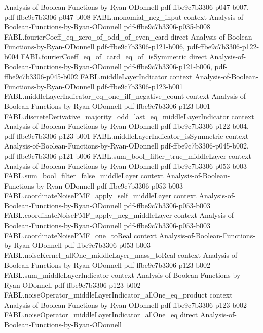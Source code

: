 \begin{theorem}
  {Analysis-of-Boolean-Functions-by-Ryan-ODonnell}
  {pdf-ffbe9c7b3306-p047-b007,
    pdf-ffbe9c7b3306-p047-b008}
\proofstep
  {FABL.monomial_neg_input}
  {context}
  {Analysis-of-Boolean-Functions-by-Ryan-ODonnell}
  {pdf-ffbe9c7b3306-p035-b008}
\proofstep
  {FABL.fourierCoeff_eq_zero_of_odd_of_even_card}
  {direct}
  {Analysis-of-Boolean-Functions-by-Ryan-ODonnell}
  {pdf-ffbe9c7b3306-p121-b006,
    pdf-ffbe9c7b3306-p122-b004}
\proofstep
  {FABL.fourierCoeff_eq_of_card_eq_of_isSymmetric}
  {direct}
  {Analysis-of-Boolean-Functions-by-Ryan-ODonnell}
  {pdf-ffbe9c7b3306-p121-b006,
    pdf-ffbe9c7b3306-p045-b002}
\proofstep
  {FABL.middleLayerIndicator}
  {context}
  {Analysis-of-Boolean-Functions-by-Ryan-ODonnell}
  {pdf-ffbe9c7b3306-p123-b001}
\proofstep
  {FABL.middleLayerIndicator_eq_one_iff_negative_count}
  {context}
  {Analysis-of-Boolean-Functions-by-Ryan-ODonnell}
  {pdf-ffbe9c7b3306-p123-b001}
\proofstep
  {FABL.discreteDerivative_majority_odd_last_eq_middleLayerIndicator}
  {context}
  {Analysis-of-Boolean-Functions-by-Ryan-ODonnell}
  {pdf-ffbe9c7b3306-p122-b004,
    pdf-ffbe9c7b3306-p123-b001}
\proofstep
  {FABL.middleLayerIndicator_isSymmetric}
  {context}
  {Analysis-of-Boolean-Functions-by-Ryan-ODonnell}
  {pdf-ffbe9c7b3306-p045-b002,
    pdf-ffbe9c7b3306-p121-b006}
\proofstep
  {FABL.sum_bool_filter_true_middleLayer}
  {context}
  {Analysis-of-Boolean-Functions-by-Ryan-ODonnell}
  {pdf-ffbe9c7b3306-p053-b003}
\proofstep
  {FABL.sum_bool_filter_false_middleLayer}
  {context}
  {Analysis-of-Boolean-Functions-by-Ryan-ODonnell}
  {pdf-ffbe9c7b3306-p053-b003}
\proofstep
  {FABL.coordinateNoisePMF_apply_self_middleLayer}
  {context}
  {Analysis-of-Boolean-Functions-by-Ryan-ODonnell}
  {pdf-ffbe9c7b3306-p053-b003}
\proofstep
  {FABL.coordinateNoisePMF_apply_neg_middleLayer}
  {context}
  {Analysis-of-Boolean-Functions-by-Ryan-ODonnell}
  {pdf-ffbe9c7b3306-p053-b003}
\proofstep
  {FABL.coordinateNoisePMF_one_toReal}
  {context}
  {Analysis-of-Boolean-Functions-by-Ryan-ODonnell}
  {pdf-ffbe9c7b3306-p053-b003}
\proofstep
  {FABL.noiseKernel_allOne_middleLayer_mass_toReal}
  {context}
  {Analysis-of-Boolean-Functions-by-Ryan-ODonnell}
  {pdf-ffbe9c7b3306-p123-b002}
\proofstep
  {FABL.sum_middleLayerIndicator}
  {context}
  {Analysis-of-Boolean-Functions-by-Ryan-ODonnell}
  {pdf-ffbe9c7b3306-p123-b002}
\proofstep
  {FABL.noiseOperator_middleLayerIndicator_allOne_eq_product}
  {context}
  {Analysis-of-Boolean-Functions-by-Ryan-ODonnell}
  {pdf-ffbe9c7b3306-p123-b002}
\proofstep
  {FABL.noiseOperator_middleLayerIndicator_allOne_eq}
  {direct}
  {Analysis-of-Boolean-Functions-by-Ryan-ODonnell}

\end{theorem}
